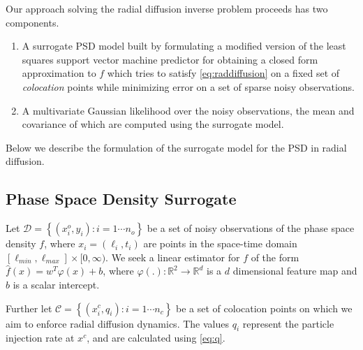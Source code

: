 Our approach solving the radial diffusion inverse problem proceeds has two components.
%
\begin{enumerate}
  \item A surrogate PSD model built by formulating a modified version of the 
        least squares support vector machine predictor for obtaining a closed form 
        approximation to $f$ which tries to satisfy \cref{eq:raddiffusion} on a fixed set of 
        \emph{colocation} points while minimizing error on a set of sparse noisy observations.
  \item A multivariate Gaussian likelihood over the noisy observations, the mean and covariance of 
        which are computed using the surrogate model.
\end{enumerate}
%
Below we describe the formulation of the surrogate model for the PSD in radial diffusion.

\subsection{Phase Space Density Surrogate}

Let $\mathcal{D}= \left\{(x^{o}_{i}, y_{i}): i = 1 \cdots n_{o} \right\}$ be a set of noisy 
observations of the phase space density $f$, where $x_{i} = (\ell_{i}, t_{i})$ are points in the 
space-time domain $[\ell_{min}, \ell_{max}] \times [0, \infty)$. We seek a linear estimator for $f$ 
of the form $\hat{f}(x) = w^{T}\varphi(x) + b$, where 
$\varphi(.): \mathbb{R}^{2} \rightarrow \mathbb{R}^{d}$ is a $d$ dimensional feature map and $b$ 
is a scalar intercept.

Further let $\mathcal{C} = \left\{ (x^{c}_{i}, q_{i}): i = 1 \cdots n_{c} \right\}$ be a set of 
colocation points on which we aim to enforce radial diffusion dynamics. The values $q_{i}$ 
represent the particle injection rate at $x^c$, and are calculated using \cref{eq:q}.

